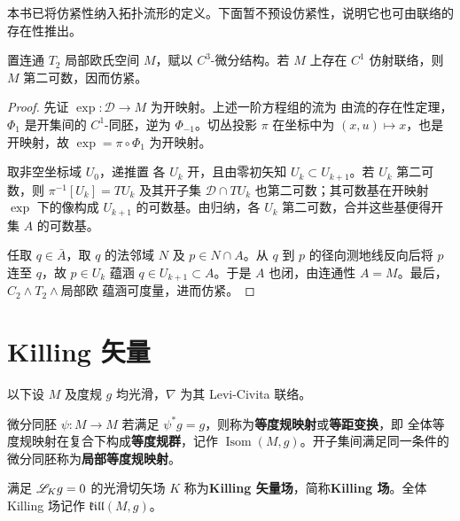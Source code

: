 本书已将仿紧性纳入拓扑流形的定义。下面暂不预设仿紧性，说明它也可由联络的存在性推出。

\begin{theorem}
    置连通 $T_2$ 局部欧氏空间 $M$，赋以 $C^3$-微分结构。若 $M$ 上存在 $C^1$ 仿射联络，则 $M$ 第二可数，因而仿紧。
\end{theorem}
\begin{proof}
    先证 $\exp:\mathcal D\to M$ 为开映射。上述一阶方程组的流为
    由流的存在性定理，$\Phi_1$ 是开集间的 $C^1$-同胚，逆为 $\Phi_{-1}$。切丛投影 $\pi$ 在坐标中为 $(x,u)\mapsto x$，也是开映射，故 $\exp=\pi\circ\Phi_1$ 为开映射。

    取非空坐标域 $U_0$，递推置
    各 $U_k$ 开，且由零初矢知 $U_k\subset U_{k+1}$。若 $U_k$ 第二可数，则 $\pi^{-1}[U_k]=TU_k$ 及其开子集 $\mathcal D\cap TU_k$ 也第二可数；其可数基在开映射 $\exp$ 下的像构成 $U_{k+1}$ 的可数基。由归纳，各 $U_k$ 第二可数，合并这些基便得开集 $A$ 的可数基。

    任取 $q\in\bar A$，取 $q$ 的法邻域 $N$ 及 $p\in N\cap A$。从 $q$ 到 $p$ 的径向测地线反向后将 $p$ 连至 $q$，故 $p\in U_k$ 蕴涵 $q\in U_{k+1}\subset A$。于是 $A$ 也闭，由连通性 $A=M$。最后，$C_2\land T_2\land\text{局部欧}$ 蕴涵可度量，进而仿紧。
\end{proof}

\section{Killing 矢量}\label{sec:killing-isometries}

以下设 $M$ 及度规 $g$ 均光滑，$\nabla$ 为其 Levi-Civita 联络。

\begin{definition}\label{def:isometry}
    微分同胚 $\psi:M\to M$ 若满足 $\psi^*g=g$，则称为\textbf{等度规映射}或\textbf{等距变换}，即
    全体等度规映射在复合下构成\textbf{等度规群}，记作 $\operatorname{Isom}(M,g)$。开子集间满足同一条件的微分同胚称为\textbf{局部等度规映射}。
\end{definition}

\begin{definition}\label{def:killing-field}
    满足 $\mathscr{L}_Kg=0$ 的光滑切矢场 $K$ 称为\textbf{Killing 矢量场}，简称\textbf{Killing 场}。全体 Killing 场记作 $\mathfrak{kill}(M,g)$。
\end{definition}

